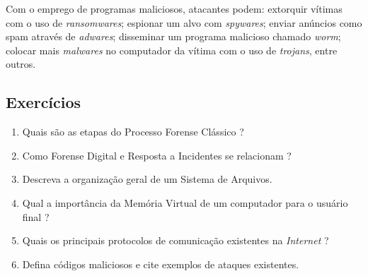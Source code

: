     \hspace{1cm}
    Com o emprego de programas maliciosos, atacantes podem: extorquir vítimas com o uso de \textit{ransomwares}; espionar um alvo com \textit{spywares}; enviar anúncios como spam através de \textit{adwares}; disseminar um programa malicioso chamado \textit{worm}; colocar mais \textit{malwares} no computador da vítima com o uso de \textit{trojans}, entre outros.

    \subsection{Exercícios}
    
    \begin{example} \label{cap1_exercicios}
        \begin{enumerate}
            \item Quais são as etapas do Processo Forense Clássico ?
            \item Como Forense Digital e Resposta a Incidentes se relacionam ?
            \item Descreva a organização geral de um Sistema de Arquivos.
            \item Qual a importância da Memória Virtual de um computador para o usuário final ?
            \item Quais os principais protocolos de comunicação existentes na \textit{Internet} ?
            \item Defina códigos maliciosos e cite exemplos de ataques existentes.
        \end{enumerate}
    \end{example}
    
\newpage

